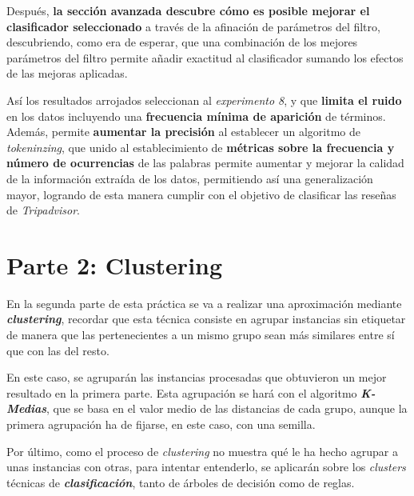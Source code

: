 \documentclass[12pt,a4paper, xcolor=table]{article}
\begin{document}
    \vspace{2mm}

    Después, \textbf{la sección avanzada descubre cómo es posible mejorar el clasificador seleccionado} a través de la afinación de parámetros del filtro, descubriendo, como era de esperar, que una combinación de los mejores parámetros del filtro permite añadir exactitud al clasificador sumando los efectos de las mejoras aplicadas.

    \vspace{3mm}

    Así los resultados arrojados seleccionan al \textit{experimento 8}, y que \textbf{limita el ruido} en los datos incluyendo una\textbf{ frecuencia mínima de aparición} de términos. Además, permite \textbf{aumentar la precisión} al establecer un algoritmo de \textit{tokeninzing}, que unido al establecimiento de \textbf{métricas sobre la frecuencia y número de ocurrencias} de las palabras permite aumentar y mejorar la calidad de la información extraída de los datos, permitiendo así una generalización mayor, logrando de esta manera cumplir con el objetivo de clasificar las reseñas de \textit{Tripadvisor}.

\newpage

\section{Parte 2: Clustering}

En la segunda parte de esta práctica se va a realizar una aproximación mediante \textbf{\textit{clustering}}, recordar que esta técnica consiste en agrupar instancias sin etiquetar de manera que las pertenecientes a un mismo grupo sean más similares entre sí que con las del resto.

\vspace{2mm}

En este caso, se agruparán las instancias procesadas que obtuvieron un mejor resultado en la primera parte. Esta agrupación se hará con el algoritmo \textbf{\textit{K-Medias}}, que se basa en el valor medio de las distancias de cada grupo, aunque la primera agrupación ha de fijarse, en este caso, con una semilla.

\vspace{2mm}

Por último, como el proceso de \textit{clustering} no muestra qué le ha hecho agrupar a unas instancias con otras, para intentar entenderlo, se aplicarán sobre los \textit{clusters} técnicas de \textit{\textbf{clasificación}}, tanto de árboles de decisión como de reglas.
\end{document}
